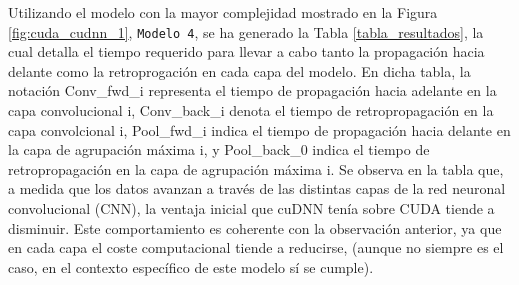 Utilizando el modelo con la mayor complejidad mostrado en la Figura \ref{fig:cuda_cudnn_1}, \texttt{Modelo 4}, se ha generado la Tabla \ref{tabla_resultados}, la cual detalla el tiempo requerido para llevar a cabo tanto la propagación hacia delante como la retroprogación en cada capa del modelo. En dicha tabla, la notación Conv\_fwd\_i representa el tiempo de propagación hacia adelante en la capa convolucional i, Conv\_back\_i denota el tiempo de retropropagación en la capa convolcional i, Pool\_fwd\_i indica el tiempo de propagación hacia delante en la capa de agrupación máxima i, y Pool\_back\_0 indica el tiempo de retropropagación en la capa de agrupación máxima i.
Se observa en la tabla que, a medida que los datos avanzan a través de las distintas capas de la red neuronal convolucional (CNN), la ventaja inicial que cuDNN tenía sobre CUDA tiende a disminuir. Este comportamiento es coherente con la observación anterior, ya que en cada capa el coste computacional tiende a reducirse, (aunque no siempre es el caso, en el contexto específico de este modelo sí se cumple).